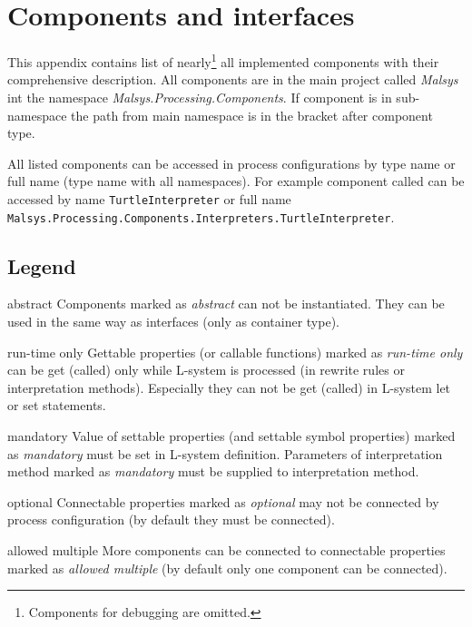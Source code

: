 
\chapter{Components and interfaces}
\label{chap:components}

This appendix contains list of nearly\footnote{Components for debugging are omitted.} all implemented components with their comprehensive description.
All components are in the main project called \emph{Malsys} int the namespace \emph{Malsys.Processing.Components}.
If component is in sub-namespace the path from main namespace is in the bracket after component type.

All listed components can be accessed in process configurations by type name or full name (type name with all namespaces).
For example component called  can be accessed by name \texttt{TurtleInterpreter} or full name \texttt{Malsys.Processing.Components.Interpreters.TurtleInterpreter}.

\section{Legend}
\begin{description*}
	\item[abstract]
		Components marked as \emph{abstract} can not be instantiated.
		They can be used in the same way as interfaces (only as container type).
	\item[run-time only]
		Gettable properties (or callable functions) marked as \emph{run-time only} can be get (called) only while L-system is processed (in rewrite rules or interpretation methods).
		Especially they can not be get (called) in L-system let or set statements.
	\item[mandatory]
		Value of settable properties (and settable symbol properties) marked as \emph{mandatory} must be set in L-system definition.
		Parameters of interpretation method marked as \emph{mandatory} must be supplied to interpretation method.
	\item[optional]
		Connectable properties marked as \emph{optional} may not be connected by process configuration (by default they must be connected).
	\item[allowed multiple]
		More components can be connected to connectable properties marked as \emph{allowed multiple} (by default only one component can be connected).
		
\end{description*}




